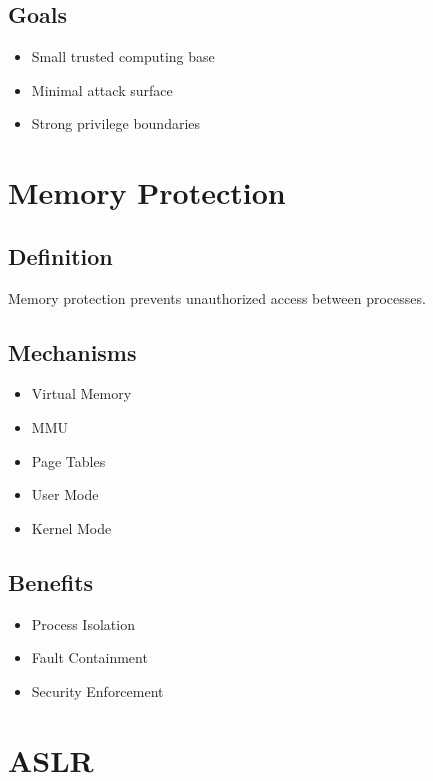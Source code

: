\subsection{Goals}

\begin{itemize}
\item Small trusted computing base
\item Minimal attack surface
\item Strong privilege boundaries
\end{itemize}

\section{Memory Protection}

\subsection{Definition}

Memory protection prevents unauthorized access between processes.

\subsection{Mechanisms}

\begin{itemize}
\item Virtual Memory
\item MMU
\item Page Tables
\item User Mode
\item Kernel Mode
\end{itemize}

\subsection{Benefits}

\begin{itemize}
\item Process Isolation
\item Fault Containment
\item Security Enforcement
\end{itemize}

\section{ASLR}

